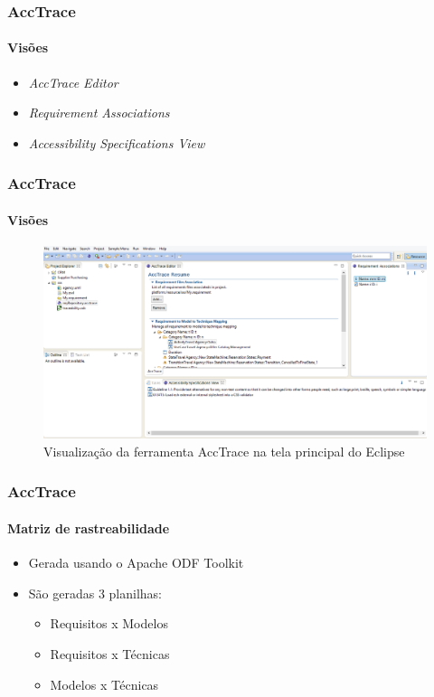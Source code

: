 \documentclass{beamer}
\begin{document}
\begin{frame}
\frametitle{AccTrace}
\framesubtitle{Visões}

\begin{itemize}
  \item \textit{AccTrace Editor}
  \item \textit{Requirement Associations}
  \item \textit{Accessibility Specifications View}
\end{itemize}

\end{frame}

\begin{frame}
\frametitle{AccTrace}
\framesubtitle{Visões}

\begin{figure}[htbp] \centering
	\includegraphics[width=\textwidth,height=.65\textheight,keepaspectratio]{./img/acctrace.png}
	\caption{Visualização da ferramenta AccTrace na tela principal do Eclipse}
	\label{fig:acctrace}
\end{figure}

\end{frame}

\begin{frame}
\frametitle{AccTrace}
\framesubtitle{Matriz de rastreabilidade}

\begin{itemize}
  \item Gerada usando o Apache ODF Toolkit \citep{odftoolkit:13}
  \item São geradas 3 planilhas:
  	\begin{itemize}
  	  \item Requisitos x Modelos
  	  \item Requisitos x Técnicas
  	  \item Modelos x Técnicas
  	\end{itemize}
\end{itemize}

\end{frame}
\end{document}
